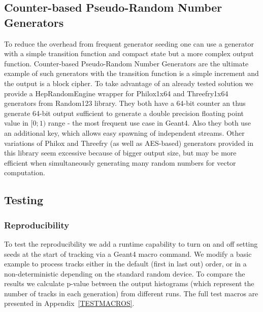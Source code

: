 \documentclass[a4paper, titlepage, 12pt]{article} %
\begin{document}
 \subsection{Counter-based Pseudo-Random Number Generators}
  To reduce the overhead from frequent generator seeding one can use a generator with a simple transition function and compact state but a more complex output function. %
  Counter-based Pseudo-Random Number Generators are the ultimate example of such generators with the transition function is a simple increment and the output is a block cipher.
  To take advantage of an already tested solution we provide a HepRandomEngine wrapper for Philox1x64 and Threefry1x64 generators from Random123 library. %
  They both have a 64-bit counter an thus generate 64-bit output sufficient to generate a double precision floating point value in $[0;1)$ range - the most frequent use case in Geant4.
  Also they both use an additional key, which allows easy spawning of independent streams.
  Other variations of Philox and Threefry (as well as AES-based) generators provided in this library seem excessive because of bigger output size, but may be more efficient when simultaneously generating many random numbers for vector computation.
 
 
 \subsection{Testing}
  \subsubsection{Reproducibility}
   To test the reproducibility we add a runtime capability to turn on and off setting seeds at the start of tracking via a Geant4 macro command.
   We modify a basic example to process tracks either in the default (first in last out) order, or in a non-deterministic depending on the standard random device.
   To compare the results we calculate p-value between the output histograms (which represent the number of tracks in each generation) from different runs.
   The full test macros are presented in Appendix~\ref{TESTMACROS}.
  
\end{document}
